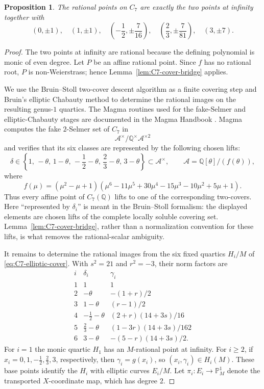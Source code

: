 \documentclass[11pt,a4paper]{amsart}
\newtheorem{proposition}[theorem]{Proposition}
\theoremstyle{definition}
\theoremstyle{remark}
\numberwithin{equation}{section}
\newcommand{\Q}{\mathbb{Q}}
\begin{document}
\begin{proposition}\label{prop:C7-rational-points}
The rational points on $C_7$ are exactly the two points at infinity together with
\[
(0,\pm1),\quad (1,\pm1),\quad
\left(-\frac12,\pm\frac7{16}\right),\quad
\left(\frac23,\pm\frac7{81}\right),\quad
(3,\pm7).
\]
\end{proposition}

\begin{proof}
The two points at infinity are rational because the defining polynomial is
monic of even degree. Let \(P\) be an affine rational point. Since \(f\) has
no rational root, \(P\) is non-Weierstrass; hence
Lemma~\ref{lem:C7-cover-bridge} applies.

We use the Bruin--Stoll two-cover descent algorithm \cite[Sections~2--3]{bruin2009two} as a finite covering step and Bruin's elliptic Chabauty method \cite[Sections~3--4]{bruin2003chabauty} to determine the rational images on the resulting genus-$1$ quartics. The Magma routines used for the fake-Selmer and elliptic-Chabauty stages are documented in the Magma Handbook \cite{magmaHandbookTwoSelmer,magmaHandbookChabauty}. Magma computes the fake $2$-Selmer set of $C_7$ in
\[
\mathscr A^\times/\Q^\times\mathscr A^{\times2}
\]
and verifies that its six classes are represented by the following chosen lifts:
\[
\delta\in
\left\{
1,\,-\theta,\,1-\theta,\,-\frac12-\theta,\,\frac23-\theta,\,3-\theta
\right\}
\subset\mathscr A^\times,
\qquad
\mathscr A=\Q[\theta]/(f(\theta)),
\]
where
\[
f(\mu)=(\mu^2-\mu+1)(\mu^6-11\mu^5+30\mu^4-15\mu^3-10\mu^2+5\mu+1).
\]
Thus every affine point of $C_7(\Q)$ lifts to one of the corresponding two-covers.
Here ``represented by $\delta_i$'' is meant in the Bruin--Stoll formalism: the displayed elements are chosen lifts of the complete locally soluble covering set. Lemma~\ref{lem:C7-cover-bridge}, rather than a normalization convention for these lifts, is what removes the rational-scalar ambiguity.

It remains to determine the rational images from the six fixed quartics $H_i/M$ of \eqref{eq:C7-elliptic-cover}. With $s^2=21$ and $r^2=-3$, their norm factors are
\[
\begin{array}{c|c|c}
i&\delta_i&\gamma_i\\ \hline
1&1&1\\
2&-\theta&-(1+r)/2\\
3&1-\theta&(r-1)/2\\
4&-\tfrac12-\theta&(2+r)(14+3s)/16\\
5&\tfrac23-\theta&(1-3r)(14+3s)/162\\
6&3-\theta&-(5-r)(14+3s)/2.
\end{array}
\]
For $i=1$ the monic quartic $H_1$ has an $M$-rational point at infinity. For $i\geq2$, if $x_i=0,1,-\tfrac12,\tfrac23,3$, respectively, then $\gamma_i=g(x_i)$, so $(x_i,\gamma_i)\in H_i(M)$. These base points identify the $H_i$ with elliptic curves $E_i/M$.
Let $\pi_i:E_i\to\mathbb P^1_M$ denote the transported $X$-coordinate
map, which has degree $2$.


\end{proof}
\end{document}
